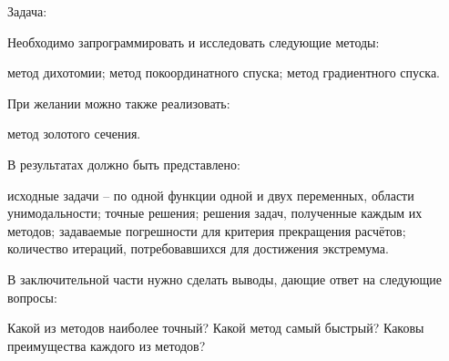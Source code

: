 Задача:

Необходимо запрограммировать и исследовать следующие методы:

метод дихотомии; метод покоординатного спуска; метод градиентного
спуска.

При желании можно также реализовать:

метод золотого сечения.

В результатах должно быть представлено:

исходные задачи – по одной функции одной и двух переменных, области
унимодальности; точные решения; решения задач, полученные каждым их
методов; задаваемые погрешности для критерия прекращения расчётов;
количество итераций, потребовавшихся для достижения экстремума.

В заключительной части нужно сделать выводы, дающие ответ на следующие
вопросы:

Какой из методов наиболее точный? Какой метод самый быстрый? Каковы
преимущества каждого из методов?

